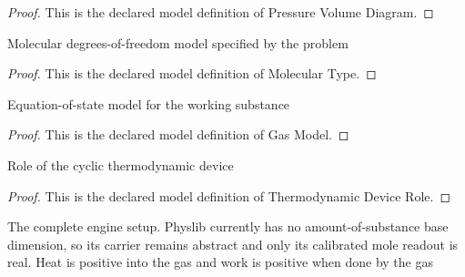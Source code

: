 \begin{proof}
  This is the declared model definition of Pressure Volume Diagram.
\end{proof}
\begin{definition}
  \label{def:physics:phyx-mini-0480:phyxminiproblems-problemphyxmini0480-moleculartype}
  Molecular degrees-of-freedom model specified by the problem
\end{definition}
\begin{proof}
  This is the declared model definition of Molecular Type.
\end{proof}
\begin{definition}
  \label{def:physics:phyx-mini-0480:phyxminiproblems-problemphyxmini0480-gasmodel}
  Equation-of-state model for the working substance
\end{definition}
\begin{proof}
  This is the declared model definition of Gas Model.
\end{proof}
\begin{definition}
  \label{def:physics:phyx-mini-0480:phyxminiproblems-problemphyxmini0480-thermodynamicdevicerole}
  Role of the cyclic thermodynamic device
\end{definition}
\begin{proof}
  This is the declared model definition of Thermodynamic Device Role.
\end{proof}
\begin{definition}
  \label{def:physics:phyx-mini-0480:phyxminiproblems-problemphyxmini0480-diatomicrectangularheatengine}
  The complete engine setup. Physlib currently has no amount-of-substance base dimension, so its carrier remains abstract and only its calibrated mole readout is real. Heat is positive into the gas and work is positive when done by the gas
\end{definition}
